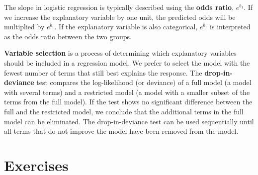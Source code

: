 \documentclass[
]{book}
\begin{document}
The slope in logistic regression is typically described using the \textbf{odds ratio}, \(e^{b_1}\). If we increase the explanatory variable by one unit, the predicted odds will be multiplied by \(e^{b_1}\). If the explanatory variable is also categorical, \(e^{b_1}\) is interpreted as the odds ratio between the two groups.

\textbf{Variable selection} is a process of determining which explanatory variables should be included in a regression model. We prefer to select the model with the fewest number of terms that still best explains the response. The \textbf{drop-in-deviance} test compares the log-likelihood (or deviance) of a full model (a model with several terms) and a restricted model (a model with a smaller subset of the terms from the full model). If the test shows no significant difference between the full and the restricted model, we conclude that the additional terms in the full model can be eliminated. The drop-in-deviance test can be used sequentially until all terms that do not improve the model have been removed from the model.

\hypertarget{exercises-5}{%
\section{Exercises}\label{exercises-5}}
\end{document}
